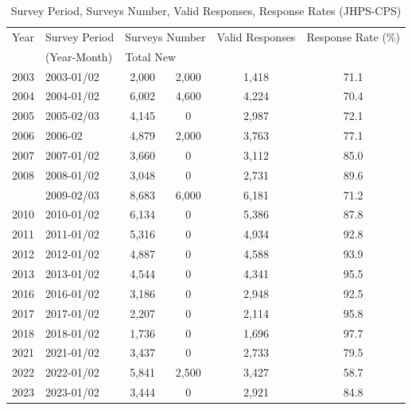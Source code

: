 \documentclass[a4paper,12pt]{article}
\begin{document}

\begin{table}[h]
\centering
\footnotesize
\caption{Survey Period, Surveys Number, Valid Responses, Response Rates (JHPS-CPS)}
\label{tab:survey_stats}
\begin{tabular}{c l c c c c}
\toprule
Year & Survey Period & \multicolumn{2}{c}{Surveys Number} & Valid Responses & Response Rate (\%) \\
     & (Year-Month)  & \multicolumn{2}{l}{\scriptsize Total \quad\quad\enspace New} & & \\
\midrule
2003 & 2003-01/02 & 2,000 & 2,000 & 1,418 & 71.1 \\
2004 & 2004-01/02 & 6,002 & 4,600 & 4,224 & 70.4 \\
2005 & 2005-02/03 & 4,145 & 0 & 2,987 & 72.1 \\
2006 & 2006-02    & 4,879 & 2,000 & 3,763 & 77.1 \\
2007 & 2007-01/02 & 3,660 & 0 & 3,112 & 85.0 \\
2008 & 2008-01/02 & 3,048 & 0 & 2,731 & 89.6 \\
\arrayrulecolor{red}\hline\hline
2009 & 2009-02/03 & 8,683 & 6,000 & 6,181 & 71.2 \\
2010 & 2010-01/02 & 6,134 & 0 & 5,386 & 87.8 \\
2011 & 2011-01/02 & 5,316 & 0 & 4,934 & 92.8 \\
2012 & 2012-01/02 & 4,887 & 0 & 4,588 & 93.9 \\
2013 & 2013-01/02 & 4,544 & 0 & 4,341 & 95.5 \\
2016 & 2016-01/02 & 3,186 & 0 & 2,948 & 92.5 \\
2017 & 2017-01/02 & 2,207 & 0 & 2,114 & 95.8 \\
2018 & 2018-01/02 & 1,736 & 0 & 1,696 & 97.7 \\
\arrayrulecolor{red}\hline\hline
\arrayrulecolor{black}
2021 & 2021-01/02 & 3,437 & 0 & 2,733 & 79.5 \\
2022 & 2022-01/02 & 5,841 & 2,500 & 3,427 & 58.7 \\
2023 & 2023-01/02 & 3,444 & 0 & 2,921 & 84.8 \\
\bottomrule
\end{tabular}

\label{table:JHPS_CPS}

\end{table}

\end{document}
